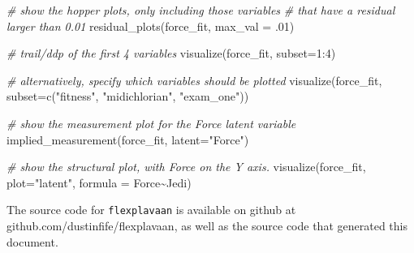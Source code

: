 \documentclass[
  english,
  man]{apa6}
\newenvironment{Shaded}{\begin{snugshade}}{\end{snugshade}}
\newcommand{\AttributeTok}[1]{\textcolor[rgb]{0.77,0.63,0.00}{#1}}
\newcommand{\CommentTok}[1]{\textcolor[rgb]{0.56,0.35,0.01}{\textit{#1}}}
\newcommand{\DecValTok}[1]{\textcolor[rgb]{0.00,0.00,0.81}{#1}}
\newcommand{\FunctionTok}[1]{\textcolor[rgb]{0.00,0.00,0.00}{#1}}
\newcommand{\NormalTok}[1]{#1}
\newcommand{\SpecialCharTok}[1]{\textcolor[rgb]{0.00,0.00,0.00}{#1}}
\newcommand{\StringTok}[1]{\textcolor[rgb]{0.31,0.60,0.02}{#1}}
\begin{document}
\begin{Shaded}
\begin{Highlighting}[]
\CommentTok{\# show the hopper plots, only including those variables }
\CommentTok{\# that have a residual larger than 0.01}
\FunctionTok{residual\_plots}\NormalTok{(force\_fit, }\AttributeTok{max\_val =}\NormalTok{ .}\DecValTok{01}\NormalTok{)}

\CommentTok{\# trail/ddp of the first 4 variables}
\FunctionTok{visualize}\NormalTok{(force\_fit, }\AttributeTok{subset=}\DecValTok{1}\SpecialCharTok{:}\DecValTok{4}\NormalTok{)}

\CommentTok{\# alternatively, specify which variables should be plotted}
\FunctionTok{visualize}\NormalTok{(force\_fit, }\AttributeTok{subset=}\FunctionTok{c}\NormalTok{(}\StringTok{"fitness"}\NormalTok{, }\StringTok{"midichlorian"}\NormalTok{, }\StringTok{"exam\_one"}\NormalTok{))}

\CommentTok{\# show the measurement plot for the Force latent variable}
\FunctionTok{implied\_measurement}\NormalTok{(force\_fit, }\AttributeTok{latent=}\StringTok{"Force"}\NormalTok{)}

\CommentTok{\# show the structural plot, with Force on the Y axis. }
\FunctionTok{visualize}\NormalTok{(force\_fit, }\AttributeTok{plot=}\StringTok{"latent"}\NormalTok{, }\AttributeTok{formula =}\NormalTok{ Force}\SpecialCharTok{\textasciitilde{}}\NormalTok{Jedi)}
\end{Highlighting}
\end{Shaded}

The source code for \texttt{flexplavaan} is available on github at github.com/dustinfife/flexplavaan, as well as the source code that generated this document.
\end{document}
